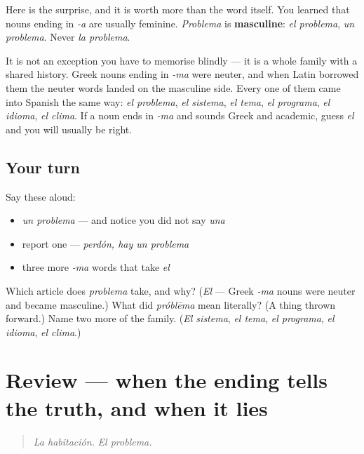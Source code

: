 \begin{grammarlens}[title={What you've built}]
Here is the surprise, and it is worth more than the word itself. You learned that nouns ending in \emph{-a} are usually feminine. \emph{Problema} is \textbf{masculine}: \emph{el problema}, \emph{un problema}. Never \emph{la problema}.

It is not an exception you have to memorise blindly — it is a whole family with a shared history. Greek nouns ending in \emph{-ma} were neuter, and when Latin borrowed them the neuter words landed on the masculine side. Every one of them came into Spanish the same way: \emph{el problema}, \emph{el sistema}, \emph{el tema}, \emph{el programa}, \emph{el idioma}, \emph{el clima}. If a noun ends in \emph{-ma} and sounds Greek and academic, guess \emph{el} and you will usually be right.
\end{grammarlens}

\subsection*{Your turn}
Say these aloud:

\begin{itemize}
\raggedright
  \item \emph{un problema} — and notice you did not say \emph{una}
  \item report one — \emph{perdón, hay un problema}
  \item three more \emph{-ma} words that take \emph{el}
\end{itemize}

\begin{tcolorbox}[breakable,colback=teal!4,colframe=teal!35!black,title={Before you move on}]
Which article does \emph{problema} take, and why? (\emph{El} — Greek \emph{-ma} nouns were neuter and became masculine.) What did \emph{próblēma} mean literally? (A thing thrown forward.) Name two more of the family. (\emph{El sistema}, \emph{el tema}, \emph{el programa}, \emph{el idioma}, \emph{el clima}.)
\end{tcolorbox}
\section[(review)]{Review — when the ending tells the truth, and when it lies}

\label{lesson:ES-C268-repaso-dos-finales-dos-generos}



\begin{quote}
\emph{La habitación.} \emph{El problema.}
\end{quote}

